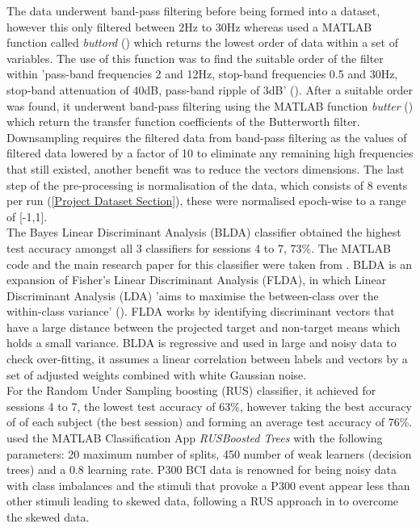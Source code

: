 The data underwent band-pass filtering before being formed into a dataset, however this only filtered between 2Hz to 30Hz whereas \cite{PalaniPaper} used a MATLAB function called \emph{buttord} (\cite{buttord}) which returns the lowest order of data within a set of variables. The use of this function was to find the suitable order of the filter within 'pass-band frequencies 2 and 12Hz, stop-band frequencies 0.5 and 30Hz, stop-band attenuation of 40dB, pass-band ripple of 3dB' (\cite{PalaniPaper}). After a suitable order was found, it underwent band-pass filtering using the MATLAB function \emph{butter} (\cite{butter}) which return the transfer function coefficients of the Butterworth filter. \\

Downsampling requires the filtered data from band-pass filtering as the values of filtered data lowered by a factor of 10 to eliminate any remaining high frequencies that still existed, another benefit was to reduce the vectors dimensions. The last step of the pre-processing is normalisation of the data, which consists of 8 events per run (\cref{Project Dataset Section}), these were normalised epoch-wise to a range of [-1,1]. \\

The Bayes Linear Discriminant Analysis (BLDA) classifier obtained the highest test accuracy amongst all 3 classifiers for sessions 4 to 7, 73\%. The MATLAB code and the main research paper for this classifier were taken from \cite{Hoffmann}. BLDA is an expansion of Fisher's Linear Discriminant Analysis (FLDA), in which Linear Discriminant Analysis (LDA) 'aims to maximise the between-class over the within-class variance' (\cite{PalaniPaper}). FLDA works by identifying discriminant vectors that have a large distance between the projected target and non-target means which holds a small variance. BLDA is regressive and used in large and noisy data to check over-fitting, it assumes a linear correlation between labels and vectors by a set of adjusted weights combined with white Gaussian noise. \\

For the Random Under Sampling boosting (RUS) classifier, it achieved for sessions 4 to 7, the lowest test accuracy of 63\%, however taking the best accuracy of of each subject (the best session) and forming an average test accuracy of 76\%. \cite{PalaniPaper} used the MATLAB Classification App \emph{RUSBoosted Trees} with the following parameters: 20 maximum number of splits, 450 number of weak learners (decision trees) and a 0.8 learning rate. P300 BCI data is renowned for being noisy data with class imbalances and the stimuli that provoke a P300 event appear less than other stimuli leading to skewed data, \cite{PalaniPaper} following a RUS approach in \cite{RUS} to overcome the skewed data. \\

